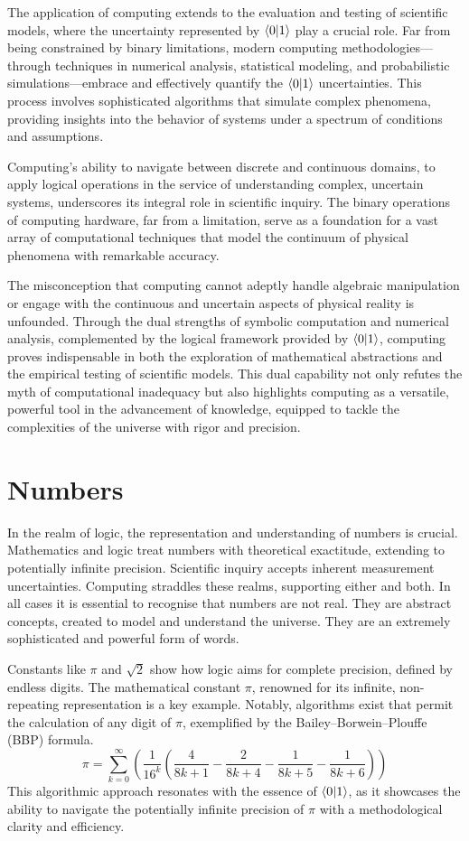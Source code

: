 \documentclass[12pt]{article}
\begin{document}
The application of computing extends to the evaluation and testing of scientific models, where the uncertainty represented by \(\langle 0 | 1 \rangle\) play a crucial role. Far from being constrained by binary limitations, modern computing methodologies—through techniques in numerical analysis, statistical modeling, and probabilistic simulations—embrace and effectively quantify the \(\langle 0 | 1 \rangle\) uncertainties. This process involves sophisticated algorithms that simulate complex phenomena, providing insights into the behavior of systems under a spectrum of conditions and assumptions.

Computing's ability to navigate between discrete and continuous domains, to apply logical operations in the service of understanding complex, uncertain systems, underscores its integral role in scientific inquiry. The binary operations of computing hardware, far from a limitation, serve as a foundation for a vast array of computational techniques that model the continuum of physical phenomena with remarkable accuracy.

The misconception that computing cannot adeptly handle algebraic manipulation or engage with the continuous and uncertain aspects of physical reality is unfounded. Through the dual strengths of symbolic computation and numerical analysis, complemented by the logical framework provided by \(\langle 0 | 1 \rangle\), computing proves indispensable in both the exploration of mathematical abstractions and the empirical testing of scientific models. This dual capability not only refutes the myth of computational inadequacy but also highlights computing as a versatile, powerful tool in the advancement of knowledge, equipped to tackle the complexities of the universe with rigor and precision.

\section*{Numbers}

In the realm of logic, the representation and understanding of numbers is crucial. Mathematics and logic treat numbers with theoretical exactitude, extending to potentially infinite precision. Scientific inquiry accepts inherent measurement uncertainties. Computing straddles these realms, supporting either and both. In all cases it is essential to recognise that numbers are not real. They are abstract concepts, created to model and understand the universe. They are an extremely sophisticated and powerful form of words.

Constants like \(\pi\) and \(\sqrt{2}\) show how logic aims for complete precision, defined by endless digits. The mathematical constant \(\pi\), renowned for its infinite, non-repeating representation is a key example. Notably, algorithms exist that permit the calculation of any digit of \(\pi\), exemplified by the Bailey–Borwein–Plouffe (BBP) formula. 
\[ \pi = \sum_{k=0}^{\infty} \left( \frac{1}{16^k} \left( \frac{4}{8k + 1} - \frac{2}{8k + 4} - \frac{1}{8k + 5} - \frac{1}{8k + 6} \right) \right) \]
This algorithmic approach resonates with the essence of \(\langle 0 | 1 \rangle\), as it showcases the ability to navigate the potentially infinite precision of \(\pi\) with a methodological clarity and efficiency.
\end{document}
